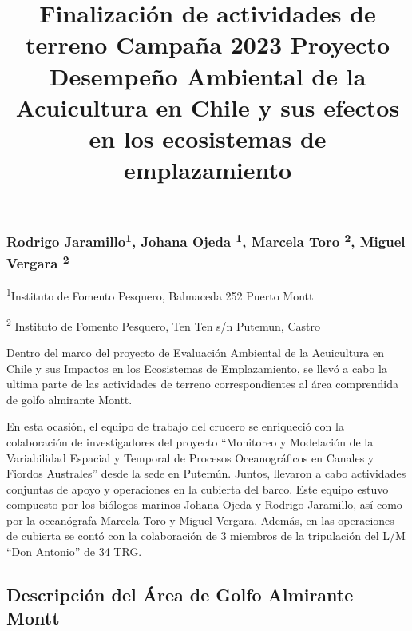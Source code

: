 \documentclass[
  letterpaper,
  DIV=11,
  numbers=noendperiod]{scrartcl}
\title{Finalización de actividades de terreno Campaña 2023 Proyecto
Desempeño Ambiental de la Acuicultura en Chile y sus efectos en los
ecosistemas de emplazamiento}
\author{}
\date{}
\begin{document}
\maketitle
\ifdefined\Shaded\renewenvironment{Shaded}{\begin{tcolorbox}[boxrule=0pt, enhanced, breakable, interior hidden, sharp corners, borderline west={3pt}{0pt}{shadecolor}, frame hidden]}{\end{tcolorbox}}\fi

\hypertarget{rodrigo-jaramillo1-johana-ojeda-1-marcela-toro-2-miguel-vergara-2}{%
\subsubsection{\texorpdfstring{Rodrigo Jaramillo\textsuperscript{1},
Johana Ojeda \textsuperscript{1}, Marcela Toro \textsuperscript{2},
Miguel Vergara
\textsuperscript{2}}{Rodrigo Jaramillo1, Johana Ojeda 1, Marcela Toro 2, Miguel Vergara 2}}\label{rodrigo-jaramillo1-johana-ojeda-1-marcela-toro-2-miguel-vergara-2}}

\textsuperscript{1}Instituto de Fomento Pesquero, Balmaceda 252 Puerto
Montt

\textsuperscript{2} Instituto de Fomento Pesquero, Ten Ten s/n Putemun,
Castro

Dentro del marco del proyecto de Evaluación Ambiental de la Acuicultura
en Chile y sus Impactos en los Ecosistemas de Emplazamiento, se llevó a
cabo la ultima parte de las actividades de terreno correspondientes al
área comprendida de golfo almirante Montt.

En esta ocasión, el equipo de trabajo del crucero se enriqueció con la
colaboración de investigadores del proyecto ``Monitoreo y Modelación de
la Variabilidad Espacial y Temporal de Procesos Oceanográficos en
Canales y Fiordos Australes'' desde la sede en Putemún. Juntos, llevaron
a cabo actividades conjuntas de apoyo y operaciones en la cubierta del
barco. Este equipo estuvo compuesto por los biólogos marinos Johana
Ojeda y Rodrigo Jaramillo, así como por la oceanógrafa Marcela Toro y
Miguel Vergara. Además, en las operaciones de cubierta se contó con la
colaboración de 3 miembros de la tripulación del L/M ``Don Antonio'' de
34 TRG.

\hypertarget{descripciuxf3n-del-uxe1rea-de-golfo-almirante-montt}{%
\subsection{Descripción del Área de Golfo Almirante
Montt}\label{descripciuxf3n-del-uxe1rea-de-golfo-almirante-montt}}
\end{document}
